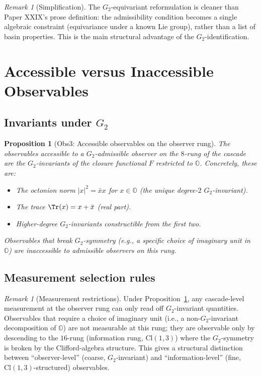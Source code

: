 \documentclass[12pt]{article}
\newtheorem{proposition}[theorem]{Proposition}
\theoremstyle{definition}
\theoremstyle{remark}
\newtheorem{remark}[theorem]{Remark}
\newcommand{\Oo}{\mathbb{O}}
\newcommand{\Gtwo}{G_2}
\newcommand{\Cl}{\mathrm{Cl}}
\begin{document}
\begin{remark}[Simplification]
The $\Gtwo$-equivariant reformulation is cleaner than Paper XXIX's prose definition: the admissibility condition becomes a single algebraic constraint (equivariance under a known Lie group), rather than a list of basin properties. This is the main structural advantage of the $\Gtwo$-identification.
\end{remark}

\section{Accessible versus Inaccessible Observables}\label{sec:accessible}

\subsection{Invariants under $\Gtwo$}

\begin{proposition}[Obs3: Accessible observables on the observer rung]\label{prop:accessible}
The observables accessible to a $\Gtwo$-admissible observer on the $8$-rung of the cascade are the $\Gtwo$-invariants of the closure functional $F$ restricted to $\Oo$. Concretely, these are:
\begin{itemize}
\item The octonion norm $|x|^2 = \bar{x} x$ for $x \in \Oo$ (the unique degree-$2$ $\Gtwo$-invariant).
\item The trace $\Tr(x) = x + \bar{x}$ (real part).
\item Higher-degree $\Gtwo$-invariants constructible from the first two.
\end{itemize}
Observables that break $\Gtwo$-symmetry (e.g., a specific choice of imaginary unit in $\Oo$) are inaccessible to admissible observers on this rung.
\end{proposition}

\subsection{Measurement selection rules}

\begin{remark}[Measurement restrictions]
Under Proposition~\ref{prop:accessible}, any cascade-level measurement at the observer rung can only read off $\Gtwo$-invariant quantities. Observables that require a choice of imaginary unit (i.e., a non-$\Gtwo$-invariant decomposition of $\Oo$) are not measurable at this rung; they are observable only by descending to the $16$-rung (information rung, $\Cl(1,3)$) where the $\Gtwo$-symmetry is broken by the Clifford-algebra structure. This gives a structural distinction between ``observer-level'' (coarse, $\Gtwo$-invariant) and ``information-level'' (fine, $\Cl(1,3)$-structured) observables.
\end{remark}
\end{document}
